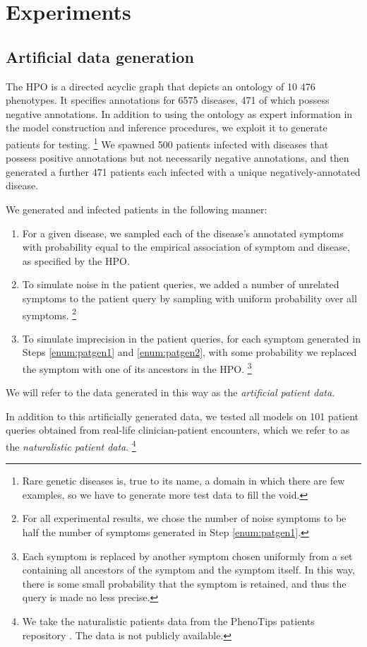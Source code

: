 \section{Experiments}
\label{sec:exp}

\subsection{Artificial data generation}

The HPO \cite{kohler2014hpo} is a directed acyclic graph that depicts an
ontology of 10 476 phenotypes.
%
It specifies annotations for 6575 diseases, 471 of which possess negative
annotations.
%
In addition to using the ontology as expert information in the model
construction and inference procedures, we exploit it to generate patients
for testing.
%
\footnote{
    Rare genetic diseases is, true to its name, a domain in which there are few
    examples, so we have to generate more test data to fill the void.
}
%
We spawned 500 patients infected with diseases that
possess positive annotations but not necessarily negative annotations, and then
generated a further 471 patients each infected with a unique
negatively-annotated disease.

We generated and infected patients in the following manner:
%
\begin{enumerate}
    \item \label{enum:patgen1}
        For a given disease, we sampled each of the disease's annotated
        symptoms with probability equal to the empirical association of symptom
        and disease, as specified by the HPO.
    \item \label{enum:patgen2}
        To simulate noise in the patient queries, we added a number
        of unrelated symptoms to the patient query by sampling with uniform
        probability over all symptoms.
        \footnote{
            For all experimental results, we chose the number of noise symptoms
            to be half the number of symptoms generated in Step
            \ref{enum:patgen1}.
        }
    \item To simulate imprecision in the patient queries, for each symptom
        generated in Steps \ref{enum:patgen1} and \ref{enum:patgen2}, with some
        probability we replaced the symptom with one of its ancestors in the
        HPO.
        \footnote{
            Each symptom is replaced by another symptom chosen uniformly from a
            set containing all ancestors of the symptom and the symptom itself.
            In this way, there is some small probability that the symptom is
            retained, and thus the query is made no less precise.
        }
\end{enumerate}
%
We will refer to the data generated in this way as the {\it artificial patient
data}.

In addition to this artificially generated data, we tested all models
on 101 patient queries obtained from real-life clinician-patient
encounters, which we refer to as the {\it naturalistic patient data}.
%
\footnote{
    We take the naturalistic patients data from the PhenoTips patients
    repository \cite{phenotips}.
    The data is not publicly available.
}



